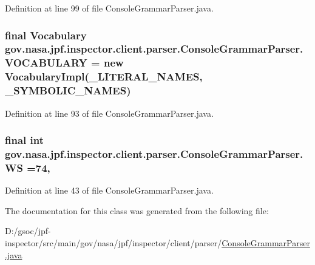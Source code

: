 Definition at line 99 of file Console\+Grammar\+Parser.\+java.

\subsubsection[{\texorpdfstring{V\+O\+C\+A\+B\+U\+L\+A\+RY}{VOCABULARY}}]{\setlength{\rightskip}{0pt plus 5cm}final Vocabulary gov.\+nasa.\+jpf.\+inspector.\+client.\+parser.\+Console\+Grammar\+Parser.\+V\+O\+C\+A\+B\+U\+L\+A\+RY = new Vocabulary\+Impl({\bf \+\_\+\+L\+I\+T\+E\+R\+A\+L\+\_\+\+N\+A\+M\+ES}, {\bf \+\_\+\+S\+Y\+M\+B\+O\+L\+I\+C\+\_\+\+N\+A\+M\+ES})\hspace{0.3cm}{\ttfamily [static]}}\hypertarget{classgov_1_1nasa_1_1jpf_1_1inspector_1_1client_1_1parser_1_1_console_grammar_parser_a7b41c74d131a98a81fe94c9a9e7be972}{}\label{classgov_1_1nasa_1_1jpf_1_1inspector_1_1client_1_1parser_1_1_console_grammar_parser_a7b41c74d131a98a81fe94c9a9e7be972}


Definition at line 93 of file Console\+Grammar\+Parser.\+java.

\subsubsection[{\texorpdfstring{WS}{WS}}]{\setlength{\rightskip}{0pt plus 5cm}final int gov.\+nasa.\+jpf.\+inspector.\+client.\+parser.\+Console\+Grammar\+Parser.\+WS =74\hspace{0.3cm}{\ttfamily [static]}, {\ttfamily [package]}}\hypertarget{classgov_1_1nasa_1_1jpf_1_1inspector_1_1client_1_1parser_1_1_console_grammar_parser_a6914a3a3adbc350b12a7df9d1b24abf1}{}\label{classgov_1_1nasa_1_1jpf_1_1inspector_1_1client_1_1parser_1_1_console_grammar_parser_a6914a3a3adbc350b12a7df9d1b24abf1}


Definition at line 43 of file Console\+Grammar\+Parser.\+java.



The documentation for this class was generated from the following file\+:\begin{DoxyCompactItemize}
\item 
D\+:/gsoc/jpf-\/inspector/src/main/gov/nasa/jpf/inspector/client/parser/\hyperlink{_console_grammar_parser_8java}{Console\+Grammar\+Parser.\+java}\end{DoxyCompactItemize}
